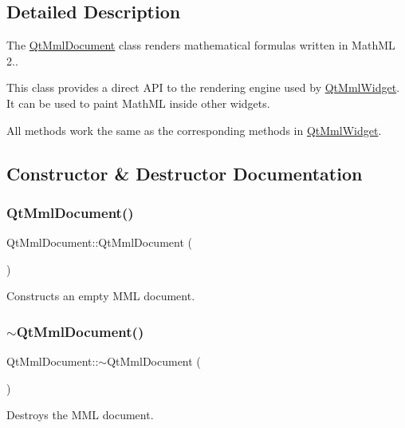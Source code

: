 \subsection{Detailed Description}
The \mbox{\hyperlink{class_qt_mml_document}{Qt\+Mml\+Document}} class renders mathematical formulas written in Math\+ML 2.. 

This class provides a direct A\+PI to the rendering engine used by \mbox{\hyperlink{class_qt_mml_widget}{Qt\+Mml\+Widget}}. It can be used to paint Math\+ML inside other widgets.

All methods work the same as the corresponding methods in \mbox{\hyperlink{class_qt_mml_widget}{Qt\+Mml\+Widget}}. 

\subsection{Constructor \& Destructor Documentation}
\mbox{\label{class_qt_mml_document_a38d53f9b6b073434a4e0ee458b9d8eca}} 
\subsubsection{\texorpdfstring{Qt\+Mml\+Document()}{QtMmlDocument()}}
{\footnotesize\ttfamily Qt\+Mml\+Document\+::\+Qt\+Mml\+Document (\begin{DoxyParamCaption}{ }\end{DoxyParamCaption})}

Constructs an empty M\+ML document. \mbox{\label{class_qt_mml_document_a09f03d96a88be2e42a7a14c633a75e94}} 
\subsubsection{\texorpdfstring{$\sim$\+Qt\+Mml\+Document()}{~QtMmlDocument()}}
{\footnotesize\ttfamily Qt\+Mml\+Document\+::$\sim$\+Qt\+Mml\+Document (\begin{DoxyParamCaption}{ }\end{DoxyParamCaption})}

Destroys the M\+ML document. 

